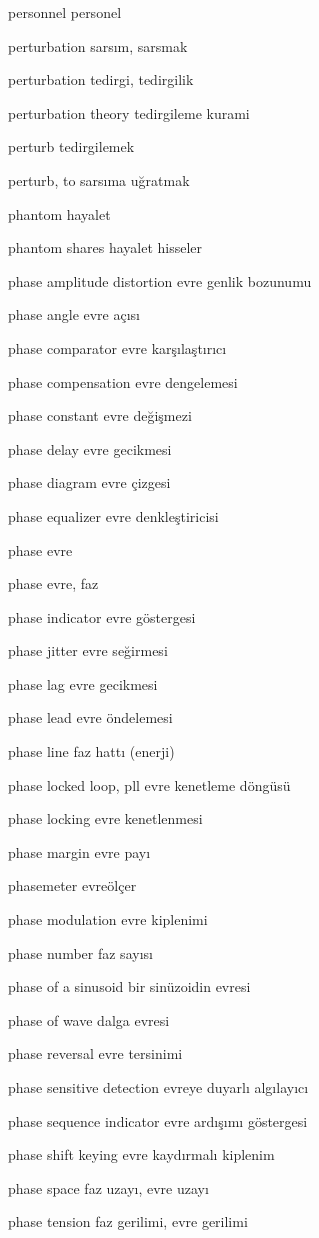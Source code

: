 \documentclass[12pt,fleqn]{article}\usepackage{../../common}
\begin{document}
personnel personel

perturbation sarsım, sarsmak

perturbation tedirgi, tedirgilik

perturbation theory tedirgileme kurami

perturb tedirgilemek

perturb, to sarsıma uğratmak

phantom hayalet

phantom shares hayalet hisseler

phase amplitude distortion evre genlik bozunumu

phase angle evre açısı

phase comparator evre karşılaştırıcı

phase compensation evre dengelemesi

phase constant evre değişmezi

phase delay evre gecikmesi

phase diagram evre çizgesi

phase equalizer evre denkleştiricisi

phase evre

phase evre, faz

phase indicator evre göstergesi

phase jitter evre seğirmesi

phase lag evre gecikmesi

phase lead evre öndelemesi

phase line faz hattı (enerji)

phase locked loop, pll evre kenetleme döngüsü

phase locking evre kenetlenmesi

phase margin evre payı

phasemeter evreölçer

phase modulation evre kiplenimi

phase number faz sayısı

phase of a sinusoid bir sinüzoidin evresi

phase of wave dalga evresi

phase reversal evre tersinimi

phase sensitive detection evreye duyarlı algılayıcı

phase sequence indicator evre ardışımı göstergesi

phase shift keying evre kaydırmalı kiplenim

phase space faz uzayı, evre uzayı

phase tension faz gerilimi, evre gerilimi
\end{document}
